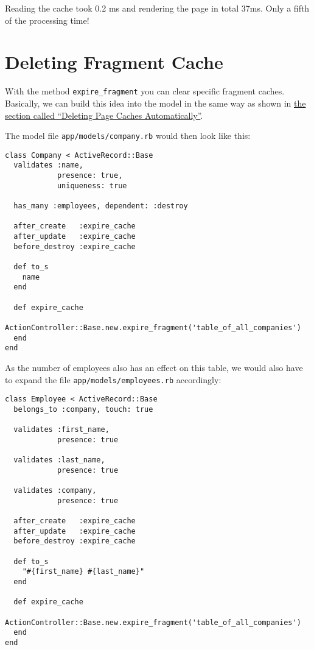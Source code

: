 \documentclass[a4paper]{book}
\newcounter{tab}[chapter]
\newcommand{\chap}[1]{\newpage\thispagestyle{empty}\chapter{#1}\label{chap:\thechapter}}
\begin{document}
Reading the cache took 0.2 ms and rendering the page in total 37ms. Only a fifth of the processing time!

\chap{Deleting Fragment Cache}\label{deleting-fragment-cache}

With the method \texttt{expire\_fragment} you can clear specific fragment caches. Basically, we can build this idea into the model in the same way as shown in \hyperref[pageux5fcachesux5fautomatischux5floeschen]{the section called “Deleting Page Caches Automatically”}.

The model file \texttt{app/models/company.rb} would then look like this:

\begin{shaded}\begin{verbatim}
class Company < ActiveRecord::Base
  validates :name,
            presence: true,
            uniqueness: true

  has_many :employees, dependent: :destroy

  after_create   :expire_cache
  after_update   :expire_cache
  before_destroy :expire_cache

  def to_s
    name
  end

  def expire_cache
    ActionController::Base.new.expire_fragment('table_of_all_companies')
  end
end
\end{verbatim}\end{shaded}

As the number of employees also has an effect on this table, we would also have to expand the file \texttt{app/models/employees.rb} accordingly:

\begin{shaded}\begin{verbatim}
class Employee < ActiveRecord::Base
  belongs_to :company, touch: true

  validates :first_name,
            presence: true

  validates :last_name,
            presence: true

  validates :company,
            presence: true

  after_create   :expire_cache
  after_update   :expire_cache
  before_destroy :expire_cache

  def to_s
    "#{first_name} #{last_name}"
  end

  def expire_cache
    ActionController::Base.new.expire_fragment('table_of_all_companies')
  end  
end
\end{verbatim}\end{shaded}
\end{document}
